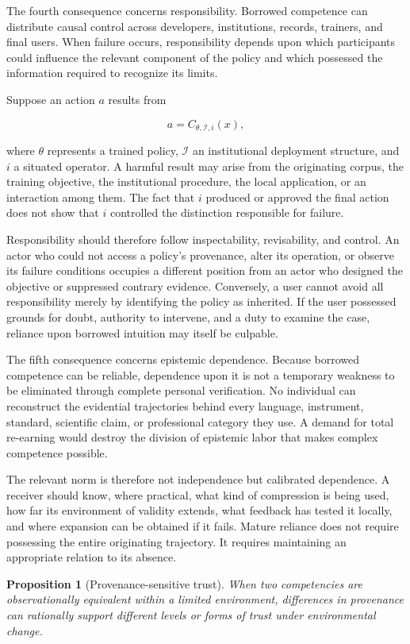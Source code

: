\documentclass[11pt]{article}
\newtheorem{proposition}{Proposition}[section]
\begin{document}
The fourth consequence concerns responsibility. Borrowed competence can distribute causal control across developers, institutions, records, trainers, and final users. When failure occurs, responsibility depends upon which participants could influence the relevant component of the policy and which possessed the information required to recognize its limits.

Suppose an action $a$ results from

\[
a
=
C_{\theta,\mathcal{I},i}(x),
\]

where $\theta$ represents a trained policy, $\mathcal{I}$ an institutional deployment structure, and $i$ a situated operator. A harmful result may arise from the originating corpus, the training objective, the institutional procedure, the local application, or an interaction among them. The fact that $i$ produced or approved the final action does not show that $i$ controlled the distinction responsible for failure.

Responsibility should therefore follow inspectability, revisability, and control. An actor who could not access a policy's provenance, alter its operation, or observe its failure conditions occupies a different position from an actor who designed the objective or suppressed contrary evidence. Conversely, a user cannot avoid all responsibility merely by identifying the policy as inherited. If the user possessed grounds for doubt, authority to intervene, and a duty to examine the case, reliance upon borrowed intuition may itself be culpable.

The fifth consequence concerns epistemic dependence. Because borrowed competence can be reliable, dependence upon it is not a temporary weakness to be eliminated through complete personal verification. No individual can reconstruct the evidential trajectories behind every language, instrument, standard, scientific claim, or professional category they use. A demand for total re-earning would destroy the division of epistemic labor that makes complex competence possible.

The relevant norm is therefore not independence but calibrated dependence. A receiver should know, where practical, what kind of compression is being used, how far its environment of validity extends, what feedback has tested it locally, and where expansion can be obtained if it fails. Mature reliance does not require possessing the entire originating trajectory. It requires maintaining an appropriate relation to its absence.

\begin{proposition}[Provenance-sensitive trust]
When two competencies are observationally equivalent within a limited environment, differences in provenance can rationally support different levels or forms of trust under environmental change.
\end{proposition}
\end{document}
